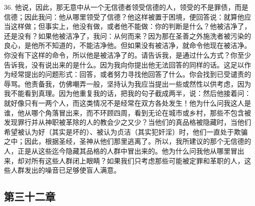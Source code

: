 36. 他说，因此，那无意中从一个无信德者领受信德的人，领受的不是罪债，而是信德；因此我问：他从哪里领受了信德？他这样被置于困境，便回答说：就算他应当这样做；但事实上，他没有做，或者他不能做：你的判断是什么？他被洁净了，还是没有？如果他被洁净了，我问：从何而来？因为那在圣善之外施洗者被污染的良心，是他所不知道的，不能洁净他。但如果没有被洁净，就命令他现在被洁净。你没有下这样的命令，所以他是被洁净了的。请告诉我，是通过什么方式？你至少告诉我，没有说出来的是什么。因为我向你提出他无法回答的同样的话。这足以作为经常提出的问题形式：回答，或者努力寻找他回答了什么。你会找到已受谴责的辱骂。他责备我，仿佛嘲弄一般，坚持认为我应当提出一些或然性以供考虑，因为我不能看到真理。因为他重复我的话，把我的句子截成两半，说：然后他接着问：就好像只有一两个人，而这类情况不是经常在双方各处发生！他为什么问我这人是谁，他从哪个角落冒出来，而不环顾四周，看到无论在城市或乡村，那些不包含被发现罪行并从神职被革除的人的教会少之又少？当他们的真品格被隐藏时，当他们希望被认为好（其实是坏的）、被认为贞洁（其实犯奸淫）时，他们一直处于欺骗之中；因此，根据圣经，圣神从他们那里逃离了。所以，我所建议的那个无信德的人，正是从这些迄今隐藏其品格的人群中冒出来的。他为什么问我他从哪里冒出来，却对所有这些人群闭上眼睛？如果我们只考虑那些可能被定罪和革职的人，这些人群发出的噪音已足够使盲人满意。\par


\subsection{第三十二章}

